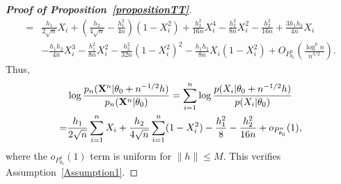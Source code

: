 \documentclass[11pt]{article}
\theoremstyle{plain}
\theoremstyle{definition}
\theoremstyle{remark}
\begin{document}
\begin{appendices}
\begin{proof}[\textbf{Proof of Proposition~\ref{propositionTT}}]
\begin{equation*}
\begin{split}
    =&
\frac{h_1}{2\sqrt{n}} X_i
+\left(\frac{h_2}{4\sqrt{n}}-\frac{h_1^2}{4n}\right)
        (1-X_i^2)
    +\frac{h_2^2}{16n}X_i^4 
    -\frac{h_2^2}{8n}X_i^2
-\frac{h_2^2}{16n}
+\frac{3 h_1 h_2}{4 n}  X_i
\\
     &-\frac{h_1 h_2}{4 n}X_i^3
     -\frac{h_1^2}{8n}X_i^2
     -\frac{h_2^2}{32n}(1-X_i^2)^2
     -\frac{h_1 h_2}{8n}X_i(1-X_i^2)
     +O_{P^n_{\theta_0}}\left(\frac{\log^6 n}{n^{3/2}}\right).
    \end{split}
\end{equation*}
Thus,
\begin{equation*}
    \begin{split}
        &
        \log 
        \frac{p_n(\mathbf{X}^{n}|\theta_0+n^{-1/2}h)}{p_n(\mathbf{X}^{n}|\theta_0)}=
        \sum_{i=1}^n\log \frac{p(X_i|\theta_0+n^{-1/2}h)}{p(X_i|\theta_0)}
    \\
    =&
    \frac{h_1}{2\sqrt{n}} \sum_{i=1}^n X_i
+
\frac{h_2}{4\sqrt{n}} \sum_{i=1}^n (1-X_i^2)
     -\frac{h_1^2}{8}
     -\frac{h_2^2}{16n}
     +o_{P^n_{\theta_0}}(1),
    \end{split}
\end{equation*}
where the $o_{P^n_{\theta_0}}(1)$ term is uniform for $\|h\|\leq M$.
This verifies Assumption~\ref{Assumption1}.


\end{proof}
\end{appendices}
\end{document}
